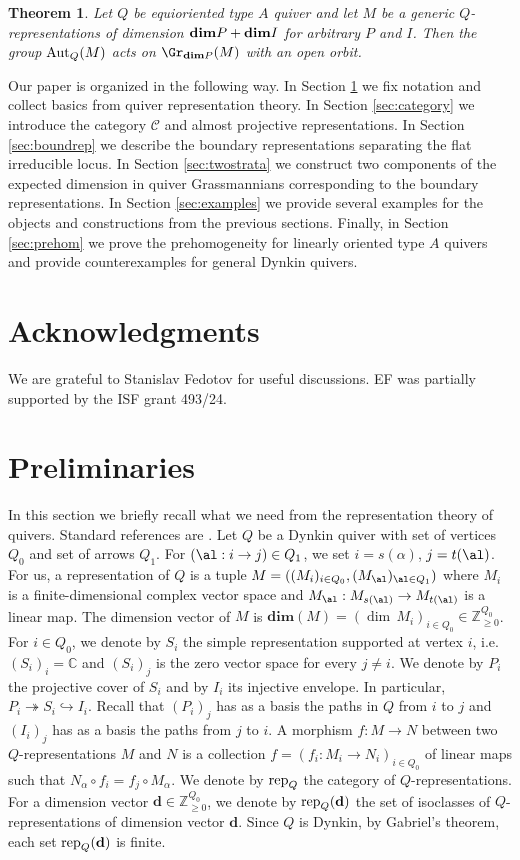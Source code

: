 \documentclass{amsart}
\newcommand{\bd}{\mathbf{d}}
\newtheorem{theoremA}{Theorem}
\numberwithin{equation}{section}
\theoremstyle{remark}
\newcommand{\bC}{{\mathbb C}}
\newcommand{\bZ}{{\mathbb Z}}
\begin{document}
\begin{theoremA}
Let $Q$ be equioriented type $A$ quiver and let $M$ be a generic $Q$-representations of dimension 
${\rm\bf dim} P + {\rm\bf dim} I$ for arbitrary $P$ and $I$. 
Then the group 
${\rm Aut}_Q(M)$ acts on $\Gr_{{\rm\bf dim} P}(M)$ with an open orbit.
\end{theoremA}


Our paper is organized in the following way. In Section \ref{sec:prelim} we fix notation 
and collect basics from  quiver representation theory.   
In Section \ref{sec:category} we introduce the category $\mathcal{C}$ and almost projective representations. 
In Section \ref{sec:boundrep} we describe the boundary representations separating the flat irreducible locus.
In Section \ref{sec:twostrata} we construct two components of the expected dimension in quiver Grassmannians corresponding to the boundary representations.
In Section \ref{sec:examples} we provide several examples for the objects and constructions 
from the previous sections.
Finally, in Section \ref{sec:prehom} we prove the prehomogeneity for linearly oriented type 
$A$ quivers and provide counterexamples for general
Dynkin quivers.

\section*{Acknowledgments}
We are grateful to Stanislav Fedotov for useful discussions.
EF was partially supported by the ISF grant 493/24.

\section{Preliminaries}\label{sec:prelim}
In this section we briefly recall what we need from the representation theory of quivers. Standard references are \cite{CB92,Schi14}. Let $Q$ be a Dynkin quiver with set of vertices $Q_0$ and set of arrows $Q_1$. For $(\al: i\to j)\in Q_1$, we set $i=s(\alpha)$, $j=t(\al)$.  For us, a representation of $Q$ is a tuple $M=((M_i)_{i\in Q_0}, (M_\al)_{\al\in Q_1})$ where  $M_i$ is a finite-dimensional complex vector space and $M_\al: M_{s(\al)}\to M_{t(\al)}$ is a linear map. The dimension vector of $M$ is $\mathbf{dim} (M)=(\dim\, M_i)_{i\in Q_0}\in \bZ_{\ge0}^{Q_0}$. 
For $i\in Q_0$, we denote by $S_i$ the simple representation supported at vertex $i$, i.e.  $(S_i)_i=\bC$ and $(S_i)_j$ is the zero vector space for every $j\ne i$. We denote by $P_i$ the projective cover of $S_i$ and by $I_i$ its injective envelope. In particular, $P_i\twoheadrightarrow S_i \hookrightarrow I_i$. Recall that $(P_i)_j$ has as a basis the paths in $Q$ from $i$ to $j$ and $(I_i)_j$ has as a basis the paths from $j$ to $i$.  A morphism $f:M\to N$ between two $Q$-representations $M$ and $N$ is a collection $f=(f_i:M_i\to N_i)_{i\in Q_0}$ of linear maps such that $N_\alpha\circ f_i=f_j\circ M_\alpha$. We denote by ${\rm rep}_Q$ the category of $Q$-representations. For a dimension vector  $\bd\in \bZ_{\ge 0}^{Q_0}$, we denote by 
${\rm rep}_Q(\bd)$ the set of isoclasses of $Q$-representations of dimension vector $\bd$. Since $Q$ is Dynkin, by Gabriel's theorem, each set ${\rm rep}_Q(\bd)$ is finite.
 
\end{document}
